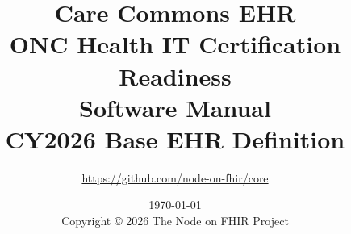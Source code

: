 \usepackage[utf8]{inputenc}
\usepackage[T1]{fontenc}
\usepackage{graphicx}
\usepackage{amsmath}
\usepackage{amssymb}
\usepackage{amsthm}
\usepackage{listings}
\usepackage{xcolor}
\usepackage{hyperref}
\usepackage{fancyhdr}
\usepackage{titlesec}
\usepackage{tocloft}
\usepackage{booktabs}
\usepackage{longtable}
\usepackage{enumitem}
\usepackage{fancyvrb}
\usepackage{pdfpages}  %



\newcommand{\maturitylabel}[1]{%
  \ifnum\pdfstrcmp{#1}{draft}=0
    \textcolor{draftcolor}{\textbf{DRAFT}}
  \else\ifnum\pdfstrcmp{#1}{implemented}=0
    \textcolor{implementedcolor}{\textbf{IMPLEMENTED}}
  \else\ifnum\pdfstrcmp{#1}{verified}=0
    \textcolor{verifiedcolor}{\textbf{VERIFIED (behavioral tests green)}}
  \else\ifnum\pdfstrcmp{#1}{validated}=0
    \textcolor{validatedcolor}{\textbf{VALIDATED}}
  \else\ifnum\pdfstrcmp{#1}{gap}=0
    \textcolor{gapcolor}{\textbf{GAP (documented, behavioral tests red)}}
  \else
    \textbf{#1}
  \fi\fi\fi\fi\fi
}



\title{
  \Huge\textbf{Care Commons EHR}\\
  \Large ONC Health IT Certification Readiness\\
  \Large Software Manual\\
  \vspace{1cm}
  \large CY2026 Base EHR Definition
}
\author{\normalsize\url{https://github.com/node-on-fhir/core}}
\date{\today\\[1em]
  \normalsize Copyright \copyright{} 2026 The Node on FHIR Project}
